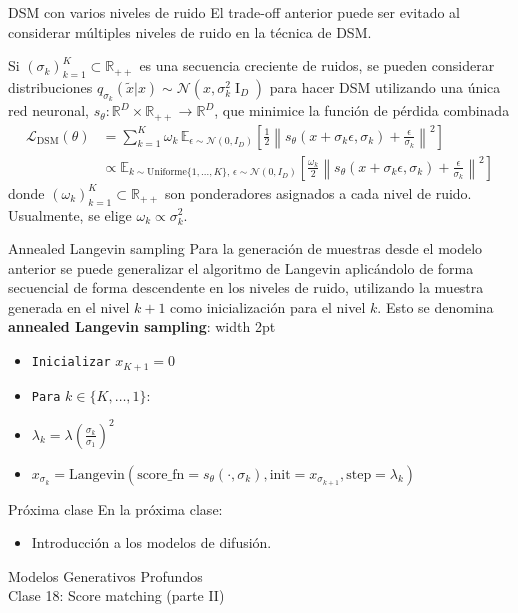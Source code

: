 \documentclass{beamer}
\newcommand{\R}{\mathbb{R}}
\begin{document}
\begin{frame}{DSM con varios niveles de ruido}
    El trade-off anterior puede ser evitado al considerar múltiples niveles de ruido en la técnica de DSM.

    Si $(\sigma_k)_{k=1}^K\subset\R_{++}$ es una secuencia creciente de ruidos, se pueden considerar distribuciones $q_{\sigma_k}(\tilde x| x)\sim \mathcal{N}(x,\sigma_k^2\operatorname{I}_D)$ para hacer DSM utilizando una única red neuronal, $s_\theta:\R^D\times\R_{++}\to\R^D$, que minimice la función de pérdida combinada
    \begin{align*}
\mathcal{L}_\text{DSM}(\theta)&=\sum_{k=1}^K \omega_k\,\mathbb{E}_{\epsilon\sim\mathcal{N}(0,I_D)}\left[\tfrac{1}{2}\left\|s_\theta(x+\sigma_k\epsilon,\sigma_k)+\tfrac{\epsilon}{\sigma_k}\right\|^2\right]\\
&\propto \mathbb{E}_{k\sim\text{Uniforme}\{1,\ldots,K\},\,\epsilon\sim\mathcal{N}(0,I_D)}\left[\tfrac{\omega_k}{2}\left\|s_\theta(x+\sigma_k\epsilon,\sigma_k)+\tfrac{\epsilon}{\sigma_k}\right\|^2\right]
\end{align*}
    donde $(\omega_k)_{k=1}^K\subset\R_{++}$ son ponderadores asignados a cada nivel de ruido. Usualmente, se elige $\omega_k\propto\sigma_k^2$.
\end{frame}

\begin{frame}{Annealed Langevin sampling}
    Para la generación de muestras desde el modelo anterior se puede generalizar el algoritmo de Langevin aplicándolo de forma secuencial de forma descendente en los niveles de ruido, utilizando la muestra generada en el nivel $k+1$ como inicialización para el nivel $k$. Esto se denomina \textbf{annealed Langevin sampling}:
    \hspace{0.5cm}\vrule width 2pt\hspace{0.3cm}%
    \begin{minipage}[t]{0.85\textwidth}
        {\small
            \begin{itemize}
                \item[] \texttt{Inicializar} $x_{K+1}=0$
                \item[] \texttt{Para} $k\in\{K,\ldots,1\}$:
                \item[] \quad $\lambda_k = \lambda \left(\frac{\sigma_k}{\sigma_1}\right)^2$
                \item[] \quad  $x_{\sigma_k}\!=\!\text{Langevin}(\text{score\_fn}\!=\!s_\theta(\cdot,\sigma_k),\text{init}\!=\!x_{\sigma_{k+1}},\text{step}\!=\!\lambda_k)$
            \end{itemize}}
    \end{minipage}
\end{frame}

\begin{frame}{Próxima clase}
    En la próxima clase:
    \begin{itemize}
        \item Introducción a los modelos de difusión.
    \end{itemize}
\end{frame}

\begin{frame}
    \centering
    \Large{Modelos Generativos Profundos}\\
    \large{Clase 18: Score matching (parte II)}
\end{frame}
\end{document}

